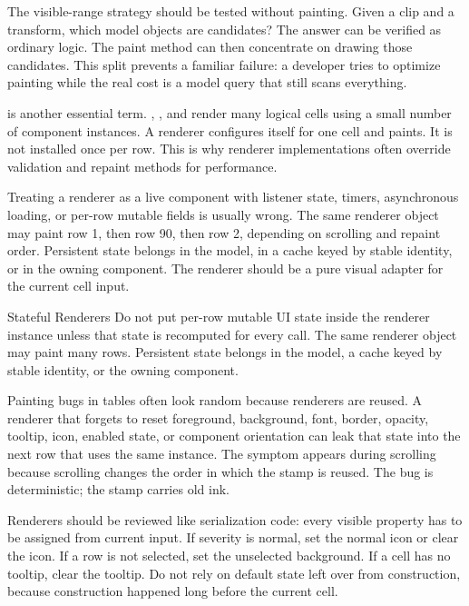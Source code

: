 The visible-range strategy should be tested without painting. Given a clip and a transform, which model objects are candidates? The answer can be verified as ordinary logic. The paint method can then concentrate on drawing those candidates. This split prevents a familiar failure: a developer tries to optimize painting while the real cost is a model query that still scans everything.

 is another essential term. , , and  render many logical cells using a small number of component instances. A renderer configures itself for one cell and paints. It is not installed once per row. This is why renderer implementations often override validation and repaint methods for performance.

Treating a renderer as a live component with listener state, timers, asynchronous loading, or per-row mutable fields is usually wrong. The same renderer object may paint row 1, then row 90, then row 2, depending on scrolling and repaint order. Persistent state belongs in the model, in a cache keyed by stable identity, or in the owning component. The renderer should be a pure visual adapter for the current cell input.

\begin{pitfallbox}{Stateful Renderers}
Do not put per-row mutable UI state inside the renderer instance unless that state is recomputed for every call. The same renderer object may paint many rows. Persistent state belongs in the model, a cache keyed by stable identity, or the owning component.
\end{pitfallbox}

Painting bugs in tables often look random because renderers are reused. A renderer that forgets to reset foreground, background, font, border, opacity, tooltip, icon, enabled state, or component orientation can leak that state into the next row that uses the same instance. The symptom appears during scrolling because scrolling changes the order in which the stamp is reused. The bug is deterministic; the stamp carries old ink.

Renderers should be reviewed like serialization code: every visible property has to be assigned from current input. If severity is normal, set the normal icon or clear the icon. If a row is not selected, set the unselected background. If a cell has no tooltip, clear the tooltip. Do not rely on default state left over from construction, because construction happened long before the current cell.

